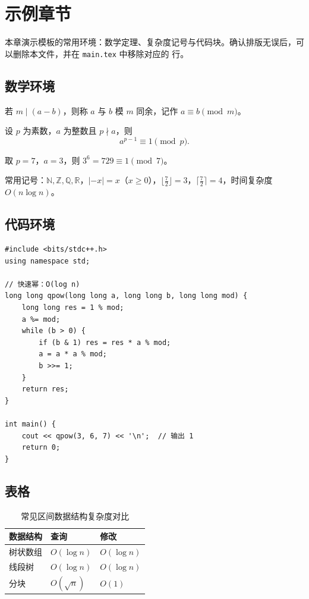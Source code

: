 \chapter{示例章节}

本章演示模板的常用环境：数学定理、复杂度记号与代码块。确认排版无误后，可以删除本文件，并在 \texttt{main.tex} 中移除对应的 \verb|| 行。

\section{数学环境}

\begin{definition}[同余]
    若 $m \mid (a - b)$，则称 $a$ 与 $b$ 模 $m$ 同余，记作 $a \equiv b \pmod{m}$。
\end{definition}

\begin{theorem}[费马小定理]
    设 $p$ 为素数，$a$ 为整数且 $p \nmid a$，则
    \[
        a^{p-1} \equiv 1 \pmod{p}.
    \]
\end{theorem}

\begin{example}
    取 $p = 7$，$a = 3$，则 $3^{6} = 729 \equiv 1 \pmod{7}$。
\end{example}

常用记号：$\mathbb{N}, \mathbb{Z}, \mathbb{Q}, \mathbb{R}$，$\lvert -x \rvert = x$（$x \ge 0$），$\lfloor \tfrac{7}{2} \rfloor = 3$，$\lceil \tfrac{7}{2} \rceil = 4$，时间复杂度 $O(n \log n)$。

\section{代码环境}

\begin{lstlisting}
#include <bits/stdc++.h>
using namespace std;

// 快速幂：O(log n)
long long qpow(long long a, long long b, long long mod) {
    long long res = 1 % mod;
    a %= mod;
    while (b > 0) {
        if (b & 1) res = res * a % mod;
        a = a * a % mod;
        b >>= 1;
    }
    return res;
}

int main() {
    cout << qpow(3, 6, 7) << '\n';  // 输出 1
    return 0;
}
\end{lstlisting}

\section{表格}

\begin{table}[h]
    \centering
    \begin{tabular}{lll}
        \toprule
        数据结构 & 查询 & 修改 \\
        \midrule
        树状数组 & $O(\log n)$ & $O(\log n)$ \\
        线段树   & $O(\log n)$ & $O(\log n)$ \\
        分块     & $O(\sqrt{n})$ & $O(1)$ \\
        \bottomrule
    \end{tabular}
    \caption{常见区间数据结构复杂度对比}
\end{table}
